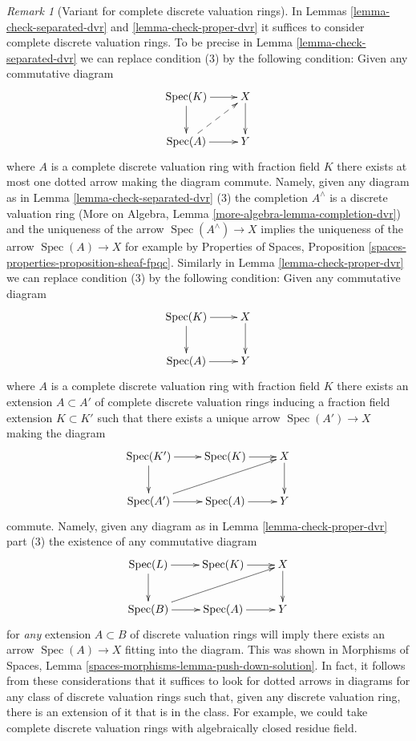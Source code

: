 \documentclass{stacks-project}
\theoremstyle{plain}
\theoremstyle{definition}
\theoremstyle{remark}
\newtheorem{remark}[subsection]{Remark}
\numberwithin{equation}{subsection}
\def\Spec{\mathop{\mathrm{Spec}}}
\begin{document}
\begin{remark}[Variant for complete discrete valuation rings]
\label{remark-variant}
In Lemmas \ref{lemma-check-separated-dvr} and \ref{lemma-check-proper-dvr}
it suffices to consider complete discrete valuation rings.
To be precise in Lemma \ref{lemma-check-separated-dvr} we can replace
condition (3) by the following condition: Given any commutative diagram
$$
\xymatrix{
\Spec(K) \ar[r] \ar[d] & X \ar[d] \\
\Spec(A) \ar[r] \ar@{-->}[ru] & Y
}
$$
where $A$ is a complete discrete valuation ring with fraction field $K$
there exists at most one dotted arrow making the diagram commute. Namely, given
any diagram as in Lemma \ref{lemma-check-separated-dvr} (3)
the completion $A^\wedge$ is a discrete valuation ring
(More on Algebra, Lemma \ref{more-algebra-lemma-completion-dvr})
and the uniqueness of the arrow $\Spec(A^\wedge) \to X$
implies the uniqueness of the arrow $\Spec(A) \to X$
for example by Properties of Spaces, Proposition
\ref{spaces-properties-proposition-sheaf-fpqc}.
Similarly in Lemma \ref{lemma-check-proper-dvr}
we can replace condition (3) by the following condition:
Given any commutative diagram
$$
\xymatrix{
\Spec(K) \ar[r] \ar[d] & X \ar[d] \\
\Spec(A) \ar[r] & Y
}
$$
where $A$ is a complete discrete valuation ring with fraction field $K$
there exists an extension $A \subset A'$ of complete discrete valuation rings
inducing a fraction field extension $K \subset K'$ such that there exists a
unique arrow $\Spec(A') \to X$ making the diagram
$$
\xymatrix{
\Spec(K') \ar[r] \ar[d] & \Spec(K) \ar[r] & X \ar[d] \\
\Spec(A') \ar[r] \ar[rru] & \Spec(A) \ar[r] & Y
}
$$
commute. Namely, given any diagram as in Lemma \ref{lemma-check-proper-dvr}
part (3) the existence of any commutative diagram
$$
\xymatrix{
\Spec(L) \ar[r] \ar[d] & \Spec(K) \ar[r] & X \ar[d] \\
\Spec(B) \ar[r] \ar[rru] & \Spec(A) \ar[r] & Y
}
$$
for {\it any} extension $A \subset B$ of discrete valuation rings
will imply there exists an arrow $\Spec(A) \to X$ fitting into
the diagram. This was shown in
Morphisms of Spaces, Lemma \ref{spaces-morphisms-lemma-push-down-solution}.
In fact, it follows from these considerations that it suffices to look
for dotted arrows in diagrams for any class of discrete valuation rings
such that, given any discrete valuation ring, there is an extension of it
that is in the class. For example, we could take complete discrete valuation
rings with algebraically closed residue field.
\end{remark}
\end{document}
